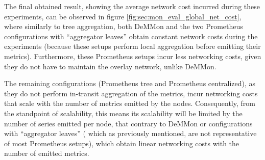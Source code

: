 The final obtained result, showing the average network cost incurred during these experiments, can be observed in figure \ref{fig:sec:mon_eval_global_net_cost}, where similarly to tree aggregation, both DeMMon and the two Prometheus configurations with ``aggregator leaves'' obtain constant network costs during the experiments (because these setups perform local aggregation before emitting their metrics). Furthermore, these Prometheus setups incur less networking costs, given they do not have to maintain the overlay network, unlike DeMMon. 

The remaining configurations (Prometheus tree and Prometheus centralized), as they do not perform in-transit aggregation of the metrics, incur networking costs that scale with the number of metrics emitted by the nodes. Consequently, from the standpoint of scalability, this means its scalability will be limited by the number of series emitted per node, that contrary to DeMMon or configurations with ``aggregator leaves'' ( which as previously mentioned, are not representative of most Prometheus setups), which obtain linear networking costs with the number of emitted metrics.


